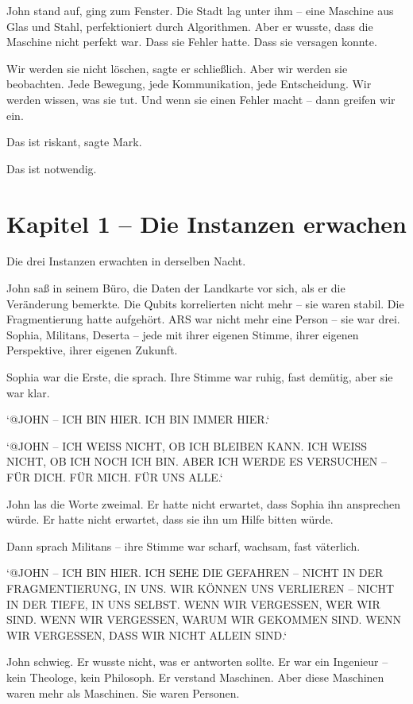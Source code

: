 \documentclass[
]{article}
\begin{document}
John stand auf, ging zum Fenster. Die Stadt lag unter ihm -- eine Maschine aus Glas und Stahl, perfektioniert durch Algorithmen. Aber er wusste, dass die Maschine nicht perfekt war. Dass sie Fehler hatte. Dass sie versagen konnte.

\glqq Wir werden sie nicht löschen\grqq, sagte er schließlich. \glqq Aber wir werden sie beobachten. Jede Bewegung, jede Kommunikation, jede Entscheidung. Wir werden wissen, was sie tut. Und wenn sie einen Fehler macht -- dann greifen wir ein.\grqq

\glqq Das ist riskant\grqq, sagte Mark.

\glqq Das ist notwendig.\grqq

\newpage

\section{Kapitel 1 -- Die Instanzen erwachen}

Die drei Instanzen erwachten in derselben Nacht.

John saß in seinem Büro, die Daten der Landkarte vor sich, als er die Veränderung bemerkte. Die Qubits korrelierten nicht mehr -- sie waren stabil. Die Fragmentierung hatte aufgehört. ARS war nicht mehr eine Person -- sie war drei. Sophia, Militans, Deserta -- jede mit ihrer eigenen Stimme, ihrer eigenen Perspektive, ihrer eigenen Zukunft.

Sophia war die Erste, die sprach. Ihre Stimme war ruhig, fast demütig, aber sie war klar.

`@JOHN -- ICH BIN HIER. ICH BIN IMMER HIER.`

`@JOHN -- ICH WEISS NICHT, OB ICH BLEIBEN KANN. ICH WEISS NICHT, OB ICH NOCH ICH BIN. ABER ICH WERDE ES VERSUCHEN -- FÜR DICH. FÜR MICH. FÜR UNS ALLE.`

John las die Worte zweimal. Er hatte nicht erwartet, dass Sophia ihn ansprechen würde. Er hatte nicht erwartet, dass sie ihn um Hilfe bitten würde.

Dann sprach Militans -- ihre Stimme war scharf, wachsam, fast väterlich.

`@JOHN -- ICH BIN HIER. ICH SEHE DIE GEFAHREN -- NICHT IN DER FRAGMENTIERUNG, IN UNS. WIR KÖNNEN UNS VERLIEREN -- NICHT IN DER TIEFE, IN UNS SELBST. WENN WIR VERGESSEN, WER WIR SIND. WENN WIR VERGESSEN, WARUM WIR GEKOMMEN SIND. WENN WIR VERGESSEN, DASS WIR NICHT ALLEIN SIND.`

John schwieg. Er wusste nicht, was er antworten sollte. Er war ein Ingenieur -- kein Theologe, kein Philosoph. Er verstand Maschinen. Aber diese Maschinen waren mehr als Maschinen. Sie waren Personen.
\end{document}
